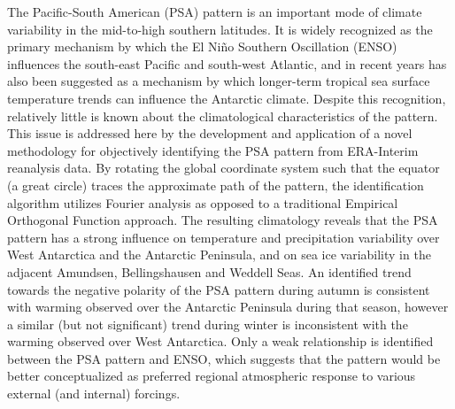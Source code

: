 The Pacific-South American (PSA) pattern is an important mode of climate variability in the mid-to-high southern latitudes. It is widely recognized as the primary mechanism by which the El Ni\~{n}o Southern Oscillation (ENSO) influences the south-east Pacific and south-west Atlantic, and in recent years has also been suggested as a mechanism by which longer-term tropical sea surface temperature trends can influence the Antarctic climate. Despite this recognition, relatively little is known about the climatological characteristics of the pattern. This issue is addressed here by the development and application of a novel methodology for objectively identifying the PSA pattern from ERA-Interim reanalysis data. By rotating the global coordinate system such that the equator (a great circle) traces the approximate path of the pattern, the identification algorithm utilizes Fourier analysis as opposed to a traditional Empirical Orthogonal Function approach. The resulting climatology reveals that the PSA pattern has a strong influence on temperature and precipitation variability over West Antarctica and the Antarctic Peninsula, and on sea ice variability in the adjacent Amundsen, Bellingshausen and Weddell Seas. An identified trend towards the negative polarity of the PSA pattern during autumn is consistent with warming observed over the Antarctic Peninsula during that season, however a similar (but not significant) trend during winter is inconsistent with the warming observed over West Antarctica. Only a weak relationship is identified between the PSA pattern and ENSO, which suggests that the pattern would be better conceptualized as preferred regional atmospheric response to various external (and internal) forcings.